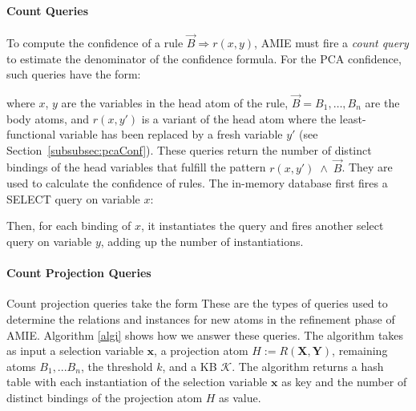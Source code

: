 \paragraph{Count Queries} To compute the confidence of a rule $\vec{B} \Rightarrow r(x, y)$, AMIE must fire a \emph{count query} to estimate the denominator
of the confidence formula. For the PCA confidence, such queries have the form:


\noindent where $x$, $y$ are the variables in the head atom of the rule, $\vec{B} = B_1, \dots, B_n$ are the body atoms, and $r(x,y')$
is a variant of the head atom where the least-functional variable has been replaced by a fresh variable $y'$ (see Section~\ref{subsubsec:pcaConf}).
These queries return the number of distinct bindings of the head variables
that fulfill the pattern $r(x, y')\; \wedge\; \vec{B}$. They are used to
calculate the confidence of rules. The in-memory database first fires a SELECT query on variable $x$:


\noindent Then, for each binding of $x$, it instantiates the query and fires another select query on variable $y$, adding up the number of instantiations.


\paragraph{Count Projection Queries} Count projection queries
take the form
These are the types of queries used to determine the relations and instances for new atoms in the refinement
phase of AMIE. Algorithm \ref{algi} shows how we answer these queries. The algorithm takes as input a selection variable $\bm{x}$, a projection atom $H:=R(\bm{X},\bm{Y})$, remaining atoms $B_1, ... B_n$, the threshold $k$,
and a KB $\mathcal{K}$.
The algorithm returns a hash table with each instantiation of the selection variable
$\bm{x}$ as key and the number of distinct bindings of the projection atom $H$ as value.

